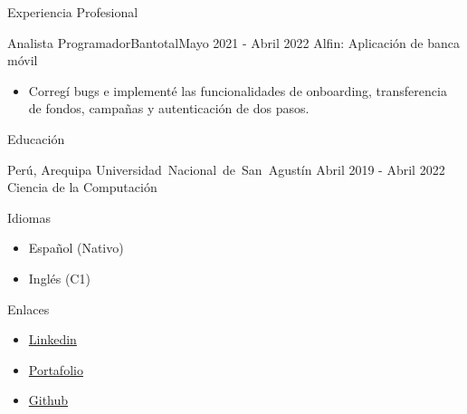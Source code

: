 \documentclass[]{mcdowell-cv/mcdowellcv}
\begin{document}
\begin{cvsection}{Experiencia Profesional}
\begin{cvsubsection}{Analista Programador}{Bantotal}{Mayo 2021 - Abril 2022}
            Alfin: Aplicación de banca móvil
            \begin{itemize}
                \item Corregí bugs e implementé las funcionalidades de onboarding, transferencia de fondos, campañas y autenticación de dos pasos.
            \end{itemize}

        \end{cvsubsection}
    \end{cvsection}

    \begin{cvsection}{Educación}
        \begin{cvsubsection}
        {Perú, Arequipa}
        {\mbox{Universidad Nacional de San Agustín}}
        {Abril 2019 - Abril 2022}
            Ciencia de la Computación
        \end{cvsubsection}
    \end{cvsection}

    \begin{cvsection}{Idiomas}
        \begin{cvsubsection}{}{}{}
            \begin{itemize}
                \item Español (Nativo)
                \item Inglés (C1)
            \end{itemize}
        \end{cvsubsection}
    \end{cvsection}

    \begin{cvsection}{Enlaces}
        \begin{cvsubsection}{}{}{}
            \begin{itemize}
                \item \href{https://www.linkedin.com/in/luis-angel-prado-postigo-813916231/}{Linkedin}
                \item \href{https://luis-prado-portfolio.netlify.app/}{Portafolio}
                \item \href{https://github.com/lpradopostigo}{Github}
            \end{itemize}
        \end{cvsubsection}
    \end{cvsection}
\end{document}
